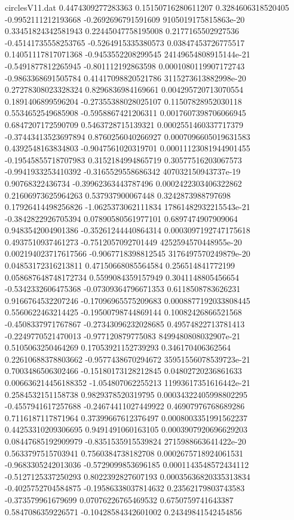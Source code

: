 \begin{filecontents}{circlesV11.dat}
0.4474309277283363	0.15150716280611207	0.3284606318520405
-0.9952111212193668	-0.2692696791591609	9105019175815863e-20
0.33451824342581943	0.22445047758195008	0.2177165502927536
-0.45141735558253765	-0.5264915335380573	0.03847453726775517
0.14051117817071368	-0.9453552208299545	24149654808915144e-21
-0.5491877812265945	-0.801112192863598	0.0001080119907172743
-0.9863368691505784	0.41417098820521786	3115273613882998e-20
0.27278308023328324	0.8296836984169661	0.004295720713070554
0.1891406899596204	-0.27355388028025107	0.11507828952030118
0.5534652549685908	-0.5958867421206311	0.0017607398706066945
0.6847207172590709	0.5463728715139321	0.0002551460337717379
-0.37443413523697894	0.8760256040266927	0.0007096605019631583
0.4392548163834803	-0.9047561020319701	0.00011123081944901455
-0.19545855718707983	0.3152184994865719	0.30577516203067573
-0.9941933253410392	-0.3165529558686342	407032150943737e-19
0.90768322436734	-0.39962363443787496	0.0002422303406322862
0.21606973625964263	0.537937900067448	0.3242873988797698
0.17926414498256826	-1.0625373062111834	17861482932215543e-21
-0.3842822926705394	0.07890580561977101	0.6897474907909064
0.9483542004901386	-0.35261244440864314	0.0003097192747175618
0.4937510937461273	-0.7512057092701449	4252594570448955e-20
0.002194023717617566	-0.9067718398812545	3176497570249879e-20
0.04853172316213811	0.47150668085564584	0.256514841772199
0.058687648748172734	0.5599084359157949	0.3041148805456654
-0.5342332606475368	-0.07309364796671353	0.6118508783626231
0.9166764532207246	-0.17096965575209683	0.0008877192033808445
0.5560622463214425	-0.19500798744869144	0.10082426866521568
-0.4508337971767867	-0.27343096232028685	0.49574822713781413
-0.2249770521470013	-0.977120879775083	8499480808032907e-21
0.5105063250464269	0.17053921152739293	0.346170406362564
0.22610688378803662	-0.9577438670294672	35951556078539723e-21
0.7003486506302466	-0.15180173128212845	0.04802720236861633
0.006636214456188352	-1.054807062255213	11993617351616442e-21
0.2584532151158738	0.9829378520319795	0.00034322405998802295
-0.4557941617257688	-0.24674411027449922	0.46907976768689286
0.7116187117871964	0.37399667612376497	0.0008003351991562237
0.44253310209306695	0.9491491060163105	0.0003907920696629203
0.08447685192909979	-0.8351535915539824	2715988663641422e-20
0.5633797515703941	0.7560384738182708	0.0002675718924061531
-0.9683305242013036	-0.5729099853696185	0.0001143548572434112
-0.5127125337250293	0.8022392827607193	0.00035636820335313834
-0.4025752704584875	-0.19586338037814632	0.23562179803743583
-0.373579961679699	0.07076226765469532	0.6750759741643387
0.5847086359226571	-0.10428584342601002	0.24349841542454856

\end{filecontents}

